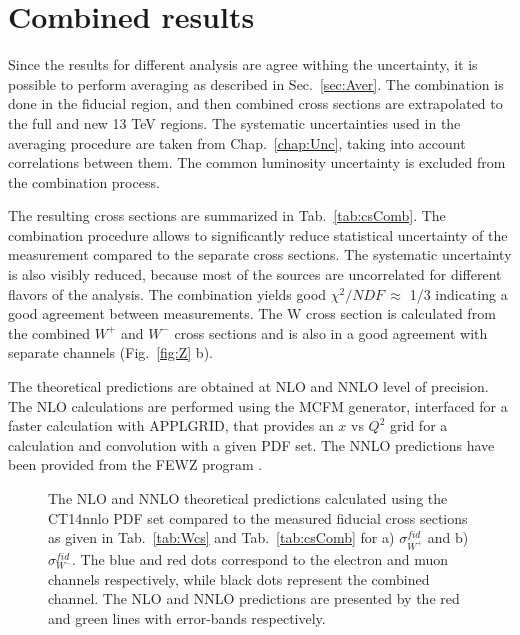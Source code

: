 \section{Combined results}\label{sec:CombCs}

Since the results for different analysis are agree withing the uncertainty, it is possible to perform averaging as described in Sec.~\ref{sec:Aver}. The combination is done in the fiducial region, and then combined cross sections are extrapolated to the full and new 13 TeV regions. The systematic uncertainties used in the averaging procedure are taken from Chap.~\ref{chap:Unc}, taking into account correlations between them. The common luminosity uncertainty is excluded from the combination process.



The resulting cross sections are summarized in Tab.~\ref{tab:csComb}.  The combination procedure allows to significantly reduce statistical uncertainty of the measurement compared to the separate cross sections. The systematic uncertainty is also visibly reduced, because most of the sources are uncorrelated for different flavors of the analysis. The combination yields good $\chi^2/NDF\, \approx$ 1/3 indicating a good agreement between measurements.  The W cross section is calculated from the combined $W^+$ and $W^-$ cross sections and is also in a good agreement with separate channels (Fig.~\ref{fig:Z} b).

The theoretical predictions are obtained at NLO and NNLO level of precision.  The NLO calculations are performed using the MCFM generator\cite{MCFM}, interfaced for a faster calculation with APPLGRID\cite{APPLGRID}, that provides an $x$ vs $Q^2$ grid for a calculation and convolution with a given PDF set. The NNLO predictions have been provided from the FEWZ  program \cite{FEWZ}.

\begin{figure}[!tbp]
\begin{minipage}[h]{0.45\linewidth}
\end{minipage}
\hfill
\begin{minipage}[h]{0.45\linewidth}
\end{minipage}
\caption{The NLO and NNLO theoretical predictions calculated using the CT14nnlo PDF set compared to the measured fiducial cross sections as given in Tab.~\ref{tab:Wcs} and Tab.~\ref{tab:csComb} for a) $\sigma^{fid}_{W^{+}}$ and b) $\sigma^{fid}_{W^-}$. The blue and red dots correspond to the electron and muon channels respectively, while black dots  represent the combined channel. The NLO and NNLO predictions are presented by the red and green lines with error-bands respectively. }
\label{fig:WpNNLO}
\end{figure}

